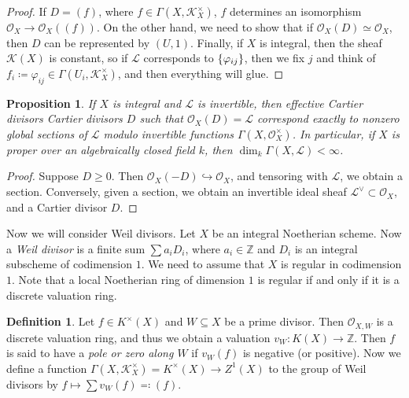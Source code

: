 \documentclass[leqno, openany]{memoir}
\newtheorem{prop}[thm]{Proposition}
\theoremstyle{definition}
\newtheorem{defn}[thm]{Definition}
\theoremstyle{remark}
\theoremstyle{plain}
\theoremstyle{definition}
\theoremstyle{remark}
\newcommand{\Z}{\mathbb{Z}}
\newcommand{\mc}[1]{\mathcal{#1}}
\begin{document}
\begin{proof} If $D = (f)$, where $f \in \Gamma(X, \mc{K}_X^{\times})$, $f$
    determines an isomorphism $\mc{O}_X \to \mc{O}_X((f))$. On the other hand,
    we need to show that if $\mc{O}_X(D) \simeq \mc{O}_X$, then $D$ can be
    represented by $(U, 1)$. Finally, if $X$ is integral, then the sheaf
    $\mc{K}(X)$ is constant, so if $\mc{L}$ corresponds to
    $\qty{\varphi_{ij}}$, then we fix $j$ and think of $f_i \coloneqq
    \varphi_{ij} \in \Gamma(U_i, \mc{K}_X^{\times})$, and then everything will
    glue.  \end{proof}

\begin{prop} If $X$ is integral and $\mc{L}$ is invertible, then effective
    Cartier divisors Cartier divisors $D$ such that $\mc{O}_X(D) = \mc{L}$
    correspond exactly to nonzero global sections of $\mc{L}$ modulo invertible
    functions $\Gamma(X, \mc{O}_X^{\times})$. In particular, if $X$ is proper
    over an algebraically closed field $k$, then $\dim_k \Gamma(X, \mc{L}) <
    \infty$.  \end{prop}

\begin{proof} Suppose $D \geq 0$. Then $\mc{O}_X(-D) \hookrightarrow \mc{O}_X$,
    and tensoring with $\mc{L}$, we obtain a section. Conversely, given a
    section, we obtain an invertible ideal sheaf $\mc{L}^{\vee} \subset
    \mc{O}_X$, and a Cartier divisor $D$.  \end{proof}

Now we will consider Weil divisors. Let $X$ be an integral Noetherian scheme.
Now a \textit{Weil divisor} is a finite sum $\sum a_i D_i$, where $a_i \in \Z$
and $D_i$ is an integral subscheme of codimension $1$. We need to assume that
$X$ is regular in codimension $1$. Note that a local Noetherian ring of
dimension $1$ is regular if and only if it is a discrete valuation ring. 

\begin{defn} Let $f \in K^{\times}(X)$ and $W \subseteq X$ be a prime divisor.
    Then $\mc{O}_{X,W}$ is a discrete valuation ring, and thus we obtain a
    valuation $v_W \colon K(X) \to \Z$. Then $f$ is said to have a \textit{pole
    or zero along $W$} if $v_W(f)$ is negative (or positive). Now we define a
    function $\Gamma(X, \mc{K}_X^{\times}) = K^{\times}(X) \to Z^1(X)$ to the
    group of Weil divisors by $f \mapsto \sum v_W(f) \eqqcolon (f)$.
\end{defn}
\end{document}
